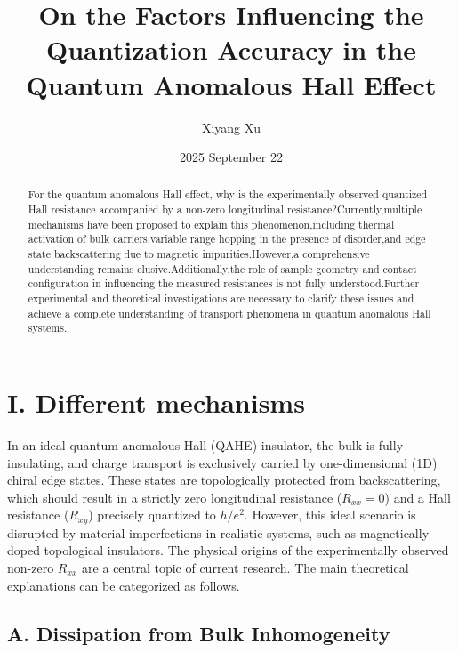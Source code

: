 \documentclass[aps,prl,reprint,groupedaddress]{revtex4-2}
\begin{document}

\title{On the Factors Influencing the Quantization Accuracy in the Quantum Anomalous Hall Effect}

\author{Xiyang Xu}

\date{2025 September 22}

\begin{abstract}
For the quantum anomalous Hall effect, why is the experimentally observed quantized Hall resistance accompanied by a non-zero longitudinal resistance?Currently,multiple mechanisms have been proposed to explain this phenomenon,including thermal activation of bulk carriers,variable range hopping in the presence of disorder,and edge state backscattering due to magnetic impurities.However,a comprehensive understanding remains elusive.Additionally,the role of sample geometry and contact configuration in influencing the measured resistances is not fully understood.Further experimental and theoretical investigations are necessary to clarify these issues and achieve a complete understanding of transport phenomena in quantum anomalous Hall systems.
\end{abstract}

\maketitle

\section{I. Different mechanisms }


In an ideal quantum anomalous Hall (QAHE) insulator, the bulk is fully insulating, and charge transport is exclusively carried by one-dimensional (1D) chiral edge states. These states are topologically protected from backscattering, which should result in a strictly zero longitudinal resistance ($R_{xx}=0$) and a Hall resistance ($R_{xy}$) precisely quantized to $h/e^2$. However, this ideal scenario is disrupted by material imperfections in realistic systems, such as magnetically doped topological insulators. The physical origins of the experimentally observed non-zero $R_{xx}$ are a central topic of current research. The main theoretical explanations can be categorized as follows.

\subsection{A. Dissipation from Bulk Inhomogeneity}
\end{document}
